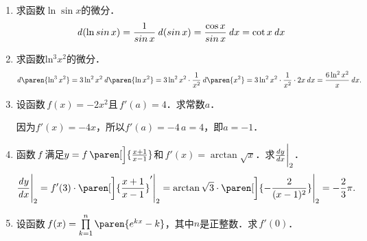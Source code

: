 \begin{enumerate}
\item 求函数\(\ln\sin x\)的微分．
  \ifshowsol
    \begin{equation*}
      \mathop{}\!\mathit{d}(\ln\operatorname{\smash{sin}} x)
      = \frac1{\operatorname{\smash{sin}} x} \mathop{}\!\mathit{d}(\operatorname{\smash{sin}} x)
      = \frac{\cos x}{\operatorname{\smash{sin}} x} \mathop{}\!\mathit{d} x
      = \cot x \mathop{}\!\mathit{d} x
    \end{equation*}
  \fi

\item 求函数\(\operatorname{ln^3} x^2\)的微分．
  \ifshowsol
    \begin{equation*}
      \diff\paren{\operatorname{ln^3} x^2}
      = 3\operatorname{ln^2} x^2 \diff\paren{\ln x^2}
      = 3\operatorname{ln^2} x^2 \cdot \frac1{x^2} \diff\paren{x^2}
      = 3\operatorname{ln^2} x^2 \cdot \frac1{x^2} \cdot 2x \dx
      = \frac{6 \operatorname{ln^2} x^2}{x} \dx.
    \end{equation*}
  \fi

\item 设函数\(\,f(x) = -2x^2\)且\(\,f'(a) = 4\)．求常数\(a\)．

  \ifshowsol
    因为\(f'(x) = -4x\)，所以\(f'(a) = -4\,a = 4\)，即\(a = -1\)．
  \fi

\item 函数\(\,f\mkern2mu\)满足\(y = f\,\paren[\Big]{\frac{x+1}{x-1}} \)和\(\,f'(x) = \arctan\sqrt x\)．求\(\frac{\mathop{}\!\mathit{d} y}{\mathop{}\!\mathit{d} x}\bigg\vert_{2}\)．
  \ifshowsol
    \begin{equation*}
      \dydx\Bigg\vert_{2}
      = f'(3) \cdot \paren[\bigg]{\frac{x+1}{x-1}}'\Bigg\vert_{2}
      = \arctan\sqrt3 \cdot \paren[\bigg]{-\frac{2}{(x-1)^2}} \Bigg\vert_{2}
      = - \frac23 \pi.
    \end{equation*}
  \fi

\item 设函数\(\,f(x) = \prod\limits_{k=1}^n \paren{e^{kx}-k}\)，其中\(n\)是正整数．求\(\,f'(0)\)．


\end{enumerate}
